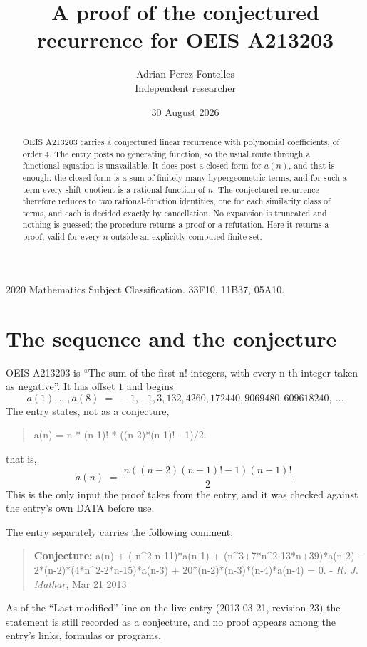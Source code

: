 \documentclass[11pt,a4paper]{article}
\title{A proof of the conjectured recurrence for OEIS A213203}
\author{Adrian Perez Fontelles\\ \small Independent researcher}
\date{30 August 2026}
\theoremstyle{plain}
\theoremstyle{definition}
\begin{document}
\maketitle

\begin{abstract}
OEIS A213203 carries a conjectured linear recurrence with polynomial coefficients, of
order 4. The entry posts no generating function, so the usual route through a
functional equation is unavailable. It does post a closed form for $a(n)$, and that is
enough: the closed form is a sum of finitely many hypergeometric terms, and for such a
term every shift quotient is a rational function of $n$. The conjectured recurrence
therefore reduces to two rational-function identities, one for each similarity
class of terms, and each is decided exactly by cancellation. No expansion is truncated and
nothing is guessed; the procedure returns a proof or a refutation. Here it returns a proof,
valid for every $n$ outside an explicitly computed finite set.
\end{abstract}

\noindent\small 2020 Mathematics Subject Classification. 33F10, 11B37, 05A10.\normalsize

\section{The sequence and the conjecture}

OEIS A213203 is ``The sum of the first n! integers, with every n-th integer taken as negative''. It has offset $1$ and begins
\[
a(1),\dots,a(8)\;=\;-1, -1, 3, 132, 4260, 172440, 9069480, 609618240,\ \dots
\]
The entry states, not as a conjecture,
\begin{quote}\small
a(n) = n * (n-1)! * ((n-2)*(n-1)! - 1)/2.
\end{quote}
that is,
\begin{equation}\label{eq:cf}
a(n)\;=\;\frac{n \left(\left(n - 2\right) \left(n - 1\right)! - 1\right) \left(n - 1\right)!}{2} .
\end{equation}
This is the only input the proof takes from the entry, and it was checked against the
entry's own DATA before use.

The entry separately carries the following comment:
\begin{quote}\small
\textbf{Conjecture:} a(n) + (-n\^{}2-n-11)*a(n-1) + (n\^{}3+7*n\^{}2-13*n+39)*a(n-2) - 2*(n-2)*(4*n\^{}2-2*n-15)*a(n-3) + 20*(n-2)*(n-3)*(n-4)*a(n-4) = 0. - \emph{R. J. Mathar}, Mar 21 2013
\end{quote}
As of the ``Last modified'' line on the live entry (2013-03-21, revision 23) the
statement is still recorded as a conjecture, and no proof appears among the entry's links,
formulas or programs.
\end{document}
